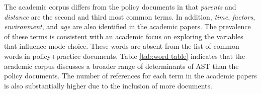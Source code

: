 \documentclass[preprint, 3p,
authoryear]{elsarticle} %
\begin{document}
The academic corpus differs from the policy documents in that
\emph{parents} and \emph{distance} are the second and third most common
terms. In addition, \emph{time}, \emph{factors}, \emph{environment}, and
\emph{age} are also identified in the academic papers. The prevalence of
these terms is consistent with an academic focus on exploring the
variables that influence mode choice. These words are absent from the
list of common words in policy+practice documents. Table
\ref{tab:word-table} indicates that the academic corpus discusses a
broader range of determinants of AST than the policy documents. The
number of references for each term in the academic papers is also
substantially higher due to the inclusion of more documents.

\begin{table}


\end{table}
\end{document}
